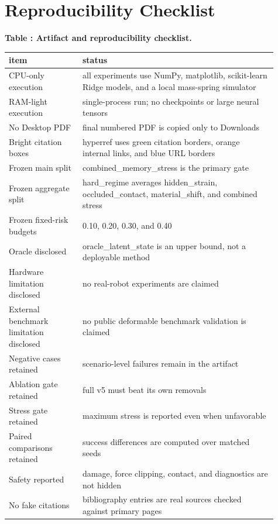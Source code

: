 \documentclass{article}
\begin{document}
\section{Reproducibility Checklist}
\footnotesize
\setlength{\tabcolsep}{2pt}
\begin{center}
\label{tab:checklist}\textbf{Table \thetable: Artifact and reproducibility checklist.}\\[0.4ex]
\begin{tabular}{p{0.25\linewidth}p{0.66\linewidth}}
\toprule
item & status \\
\midrule
CPU-only execution & all experiments use NumPy, matplotlib, scikit-learn Ridge models, and a local mass-spring simulator \\
RAM-light execution & single-process run; no checkpoints or large neural tensors \\
No Desktop PDF & final numbered PDF is copied only to Downloads \\
Bright citation boxes & hyperref uses green citation borders, orange internal links, and blue URL borders \\
Frozen main split & combined\_memory\_stress is the primary gate \\
Frozen aggregate split & hard\_regime averages hidden\_strain, occluded\_contact, material\_shift, and combined stress \\
Frozen fixed-risk budgets & 0.10, 0.20, 0.30, and 0.40 \\
Oracle disclosed & oracle\_latent\_state is an upper bound, not a deployable method \\
Hardware limitation disclosed & no real-robot experiments are claimed \\
External benchmark limitation disclosed & no public deformable benchmark validation is claimed \\
Negative cases retained & scenario-level failures remain in the artifact \\
Ablation gate retained & full v5 must beat its own removals \\
Stress gate retained & maximum stress is reported even when unfavorable \\
Paired comparisons retained & success differences are computed over matched seeds \\
Safety reported & damage, force clipping, contact, and diagnostics are not hidden \\
No fake citations & bibliography entries are real sources checked against primary pages \\
\bottomrule
\end{tabular}
\end{center}
\normalsize
\end{document}
